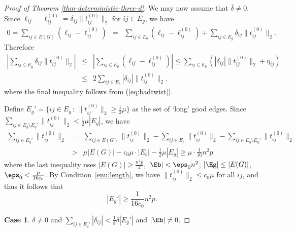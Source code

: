 \begin{proof}[Proof of Theorem \ref{thm-deterministic-three-d}]
\medskip

We may now assume that $\overline{\delta}\neq0$.
Since $\ell_{ij}-\ell_{ij}^{(0)}=\delta_{ij}\|t_{ij}^{(0)}\|_2$ for
$ij\in E_{g}$, we have 
\begin{eqnarray*}
0=\sum_{ij \in E(G)}(\ell_{ij}-\ell_{ij}^{(0)}) & = & \sum_{ij\in E_{b}}(\ell_{ij}-\ell_{ij}^{(0)})+\sum_{ij\in E_{g}}\delta_{ij}\|t_{ij}^{(0)}\|_2.
\end{eqnarray*}
Therefore 
\begin{eqnarray}
\left|\sum_{ij\in E_{g}}\delta_{ij}\|t_{ij}^{(0)}\|_2\right| & \le & \left|\sum_{ij\in E_{b}}(\ell_{ij}-\ell_{ij}^{(0)})\right|\le\sum_{ij\in E_{b}}(|\delta_{ij}|\|t_{ij}^{(0)}\|_2+\eta_{ij})\nonumber \\
 & \le & 2\sum_{ij\in E_{b}}|\delta_{ij}|\|t_{ij}^{(0)}\|_2.\label{eq:good_parallel}
\end{eqnarray}
where the final inequality follows from (\ref{eq:badtwist}). 

Define $E_{g}'=\{ij\in E_{g}\,:\,\|t_{ij}^{(0)}\|_2\ge\frac{1}{2}\mu\}$
as the set of `long' good edges. Since $\sum_{ij\in E_{g}\setminus E_{g}'}\|t_{ij}^{(0)}\|_2 < \frac{1}{2}\mu|E_{g}|$,
we have 
\begin{eqnarray*}
	\sum_{ij\in E_{g}'}\|t_{ij}^{(0)}\|_2 
	& = & \sum_{ij\in E(G)}\|t_{ij}^{(0)}\|_2-\sum_{ij\in E_{b}}\|t_{ij}^{(0)}\|_2-\sum_{ij\in E_{g}\setminus E_{g}'}\|t_{ij}^{(0)}\|_2\\
	& > & \mu|E(G)|-c_{0}\mu\cdot|E_{b}|-\frac{1}{2}\mu|E_{g}| \geq \mu\cdot\frac{1}{16}n^{2}p.
\end{eqnarray*}
where the last inequality uses $|E(G)| \geq \frac{n^2 p}{4}$, $|\Eb| < \eps_0 n^2$, $|\Eg| \leq |E(G)|$, $\eps_0 < \frac{p}{16 c_0}$.
By Condition~\ref{enu:length}, we have $\|t_{ij}^{(0)}\|_2\le c_{0}\mu$
for all $ij$, and thus it follows that 
\begin{equation}\label{eq:longgoodedges}
|E_{g}'|\ge\frac{1}{16c_{0}}n^{2}p.
\end{equation}

\medskip

\noindent\textbf{Case 1}. $\overline{\delta} \neq 0$ and  $\sum_{ij\in E_{g}'}|\delta_{ij}|<\frac{1}{8}\overline{\delta}|E_{g}'|$ and $|\Eb| \neq 0$.


\end{proof}
